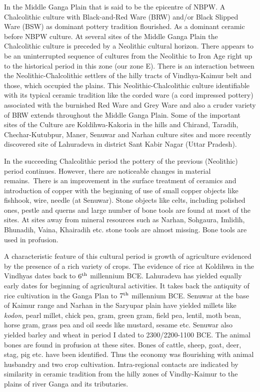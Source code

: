 In the Middle Ganga Plain that is said to be the epicentre of NBPW. A Chalcolithic culture with Black-and-Red Ware (BRW) and/or Black Slipped Ware (BSW) as dominant pottery tradition flourished. As a dominant ceramic before NBPW culture. At several sites of the Middle Ganga Plain the Chalcolithic culture is preceded by a Neolithic cultural horizon. There appears to be an uninterrupted sequence of cultures from the Neolithic to Iron Age right up to the historical period in this zone (our zone E). There is an interaction between the Neolithic-Chalcolithic settlers of the hilly tracts of Vindhya-Kaimur belt and those, which occupied the plains. This Neolithic-Chalcolithic culture identifiable with its typical ceramic tradition like the corded ware (a cord impressed pottery) associated with the burnished Red Ware and Grey Ware and also a cruder variety of BRW extends throughout the Middle Ganga Plain. Some of the important sites of the Culture are Koldihwa-Kakoria in the hills and Chirand, Taradih, Chechar-Kutubpur, Maner, Senuwar and Narhan culture sites and more recently discovered site of Lahuradeva in district Sant Kabir Nagar (Uttar Pradesh). 

In the succeeding Chalcolithic period the pottery of the previous (Neolithic) period continues. However, there are noticeable changes in material remains.~There is an improvement in the surface treatment of ceramics and introduction of copper with the beginning of use of small copper objects like fishhook, wire, needle (at Senuwar). Stone objects like celts, including polished ones, pestle and querns and large number of bone tools are found at most of the sites. At sites away from mineral resources such as Narhan, Sohgaura, Imlidih, Bhunadih, Vaina, Khairadih etc. stone tools are almost missing. Bone tools are used in profusion.

A characteristic feature of this cultural period is growth of agriculture evidenced by the presence of a rich variety of crops. The evidence of rice at Koldihwa in the Vindhyas dates back to $6^{\rm th}$ millennium BCE. Lahuradeva has yielded equally early dates for beginning of agricultural activities. It takes back the antiquity of rice cultivation in the Ganga Plan to $7^{\rm th}$ millennium BCE. Senuwar at the base of Kaimur range and Narhan in the Saryupar plain have yielded millets like \textit{kodon}, pearl millet, chick pea, gram, green gram, field pea, lentil, moth bean, horse gram, grass pea and oil seeds like mustard, sesame etc. Senuwar also yielded barley and wheat in period I dated to 2300/2200-1100 BCE. The animal bones are found in profusion at these sites. Bones of cattle, sheep, goat, deer, stag, pig etc. have been identified. Thus the economy was flourishing with animal husbandry and two crop cultivation. Intra-regional contacts are indicated by similarity in ceramic tradition from the hilly zones of Vindhy-Kaimur to the plains of river Ganga and its tributaries.

